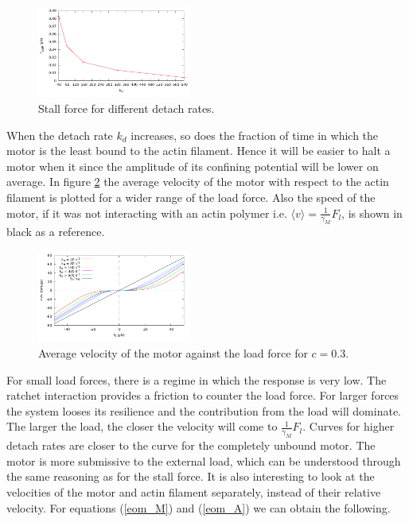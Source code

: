 \documentclass[aps,pre,twocolumn,showpacs,showkeys,a4paper]{revtex4}
\begin{document}
\begin{figure}[t]
\centering
\includegraphics[width=0.45\textwidth,height=!]{k_Fstall}
\caption{Stall force for different detach rates.}
\label{Fig: k_Fstall} 
\end{figure}
When the detach rate $k_{d}$ increases, so does the fraction of time in which the motor is the least bound to the actin filament. 
Hence it will be easier to halt a motor when it since the amplitude of its confining potential will be lower on average.
In figure \ref{Fig: F_v} the average velocity of the motor with respect to the actin filament is plotted for a wider range of the load force. 
Also the speed of the motor, if it was not  interacting with an actin polymer i.e. $\langle v \rangle = \frac{1}{\gamma_M}F_l$, is shown in black as a reference.
\begin{figure}[b]
\centering
\includegraphics[width=0.45\textwidth,height=!]{F_v}
\caption{Average velocity of the motor against the load force for $c=0.3$.}
\label{Fig: F_v} 
\end{figure}
For small load forces, there is a regime in which the response is very low. 
The ratchet interaction provides a friction to counter the load force. 
For larger forces the system looses its resilience and the contribution from the load will dominate. 
The larger the load, the closer the velocity will come to  $\frac{1}{\gamma_M}F_l$.
Curves for higher detach rates are closer to the curve for the completely unbound motor. 
The motor is more submissive to the external load, which can be understood through the same reasoning as for the stall force.
It is also interesting to look at the velocities of the motor and actin filament separately, instead of their relative velocity. 
For equations (\ref{eom_M}) and (\ref{eom_A}) we can obtain the following.
\end{document}
